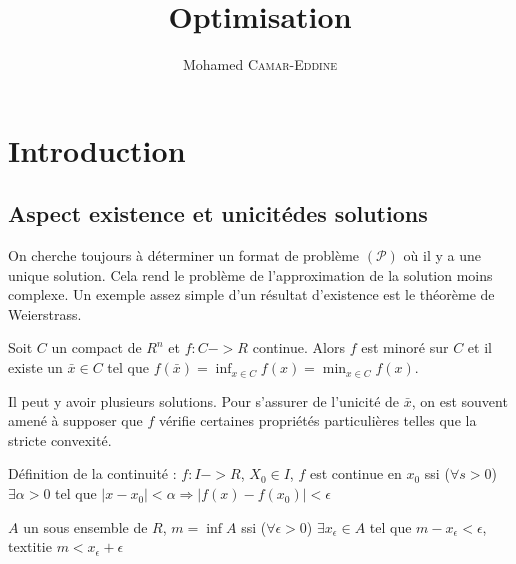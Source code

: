 \providecommand{\VarRectoVerso}{oneside}


%

\title{Optimisation}
\author{Mohamed \textsc{Camar-Eddine}}


\usepackage{amsmath}


\maketitle

\tableofcontents

\newpage{}

\section{Introduction}


	\subsection{Aspect \og existence et unicité\fg des solutions}
	
	On cherche toujours à déterminer un format de problème $(\mathcal{P})$ où il y a une unique solution. Cela rend le problème de l'approximation de la solution moins complexe. Un exemple assez simple d'un résultat d'existence est le théorème de Weierstrass.
	
	Soit $C$ un compact de $R^n$ et $f: C->R$ continue. Alors $f$ est minoré sur $C$ et il existe un $\bar{x} \in C$ tel que $f(\bar{x}) = \inf_{x \in C} f(x) = \min_{x \in C} f(x)$.
	
	Il peut y avoir plusieurs solutions. Pour s'assurer de l'unicité de $\bar{x}$, on est souvent amené à supposer que $f$ vérifie certaines propriétés particulières telles que la stricte convexité.
	
	\begin{definition}
	Définition de la continuité :
	$f:I->R$, $X_0 \in I$, $f$ est continue en $x_0$ ssi ($ \forall s>0$) $\exists \alpha >0$ tel que $|x-x_0| < \alpha \Rightarrow |f(x)-f(x_0)| < \epsilon$
	\end{definition}
	
	$A$ un sous ensemble de $R$, $m = \inf A$ ssi ($\forall \epsilon>0$) $\exists x_\epsilon \in A$ tel que $m - x_\epsilon < \epsilon$, textit{ie} $m < x_\epsilon + \epsilon$
	
